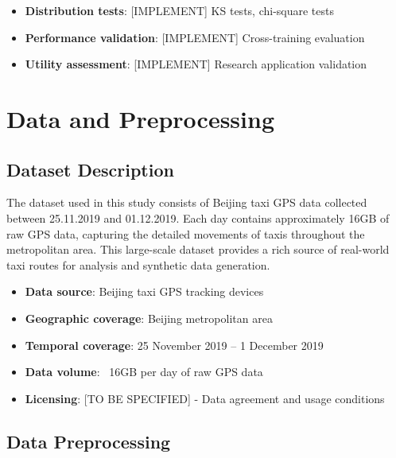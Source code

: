 \documentclass[runningheads]{llncs}
\begin{document}
\begin{itemize}
\item \textbf{Distribution tests}: [IMPLEMENT] KS tests, chi-square tests
\item \textbf{Performance validation}: [IMPLEMENT] Cross-training evaluation
\item \textbf{Utility assessment}: [IMPLEMENT] Research application validation
\end{itemize}


\section{Data and Preprocessing}
\label{sec:data-preprocessing}


\subsection{Dataset Description}
\label{sec:data}

The dataset used in this study consists of Beijing taxi GPS data collected between 25.11.2019 and 01.12.2019. Each day contains approximately 16GB of raw GPS data, capturing the detailed movements of taxis throughout the metropolitan area. This large-scale dataset provides a rich source of real-world taxi routes for analysis and synthetic data generation.

\begin{itemize}
\item \textbf{Data source}: Beijing taxi GPS tracking devices
\item \textbf{Geographic coverage}: Beijing metropolitan area
\item \textbf{Temporal coverage}: 25 November 2019 -- 1 December 2019
\item \textbf{Data volume}: ~16GB per day of raw GPS data
\item \textbf{Licensing}: [TO BE SPECIFIED] - Data agreement and usage conditions
\end{itemize}


\subsection{Data Preprocessing}
\label{sec:preprocessing}
\end{document}
